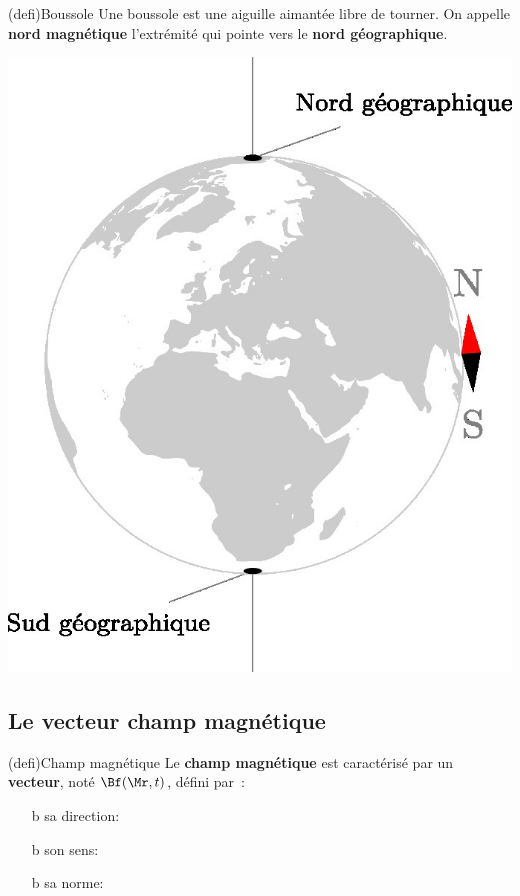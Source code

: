\documentclass[../../main/main.tex]{subfiles}
\begin{document}
\begin{tcb*}[sidebyside, righthand ratio=.2](defi){Boussole}
	Une boussole est une aiguille aimantée libre de tourner. On appelle
	\textbf{nord magnétique} l'extrémité qui pointe vers le \textbf{nord
		géographique}.
	\tcblower
	\begin{center}
		\includegraphics[width=\linewidth]{bouss_terre.jpg}
	\end{center}
\end{tcb*}

\subsection{Le vecteur champ magnétique}
\begin{tcb*}(defi){Champ magnétique}
	Le \textbf{champ magnétique} est caractérisé par un
	\textbf{vecteur}, noté $\Bf (\Mr,t)$, défini par~:
	\begin{itemize}
		\item[b]{sa direction}: 
		\item[b]{son sens}: 
		\item[b]{sa norme}: 
	\end{itemize}
\end{tcb*}
\end{document}
